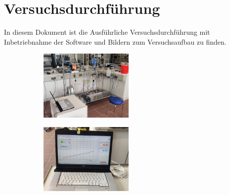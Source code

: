 \documentclass[a4paper, 11pt, draft=false]{scrartcl}
\begin{document}
	\section{Versuchsdurchführung}
	\label{sec:durchfuerung}
	In diesem Dokument ist die Ausführliche Versuchsdurchführung mit Inbetriebnahme der Software und Bildern zum Versuchsaufbau zu finden.
	
	\begin{figure}[h!]
		\begin{subfigure}[c]{0.5\textwidth}
			\centering
			\includegraphics[width=0.5\textwidth]{img/Gesamtaufbau}
			\captionsetup{labelformat=empty}
		\end{subfigure}
	\begin{subfigure}[c]{0.5\textwidth}
		\centering
		\includegraphics[width=0.5\textwidth]{img/Thermostat_Logging}
		\captionsetup{labelformat=empty}
	\end{subfigure}
		
	\end{figure}
	\FloatBarrier
	
\end{document}
